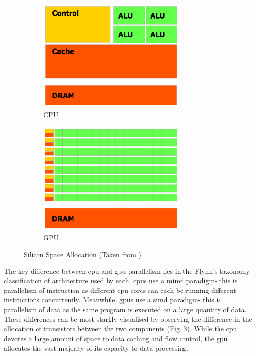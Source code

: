 \documentclass{UoYCSproject}
\begin{document}
\begin{figure}[htp]
\begin{subfigure}{0.50\textwidth}
\centering
\includegraphics[width=0.8\textwidth]{Appendix/CPU}
\caption{CPU}
\label{fig:cpu_structure}
\end{subfigure}
\begin{subfigure}{0.50\textwidth}
\centering
\includegraphics[width=0.8\textwidth]{Appendix/GPU}
\caption{GPU}
\label{fig:gpu_structure}
\end{subfigure}

\caption{Silicon Space Allocation (Taken from \cite[p.2]{cuda_doc})}
\label{fig:gpu_v_cpu}
\end{figure}

The key difference between \gls{cpu} and \gls{gpu} parallelism lies in the Flynn's taxonomy classification \cite{flynns_taxonomy} of architecture used by each.
\gls{cpu}s use a \gls{mimd} paradigm- this is parallelism of instruction as different \gls{cpu} cores can each be running different instructions concurrently.
Meanwhile, \gls{gpu}s use a \gls{simd} paradigm- this is parallelism of data as the same program is executed on a large quantity of data.
These differences can be most starkly visualised by observing the difference in the allocation of transistors between the two components (Fig. \ref{fig:gpu_v_cpu}). While the \gls{cpu} devotes a large amount of space to data caching and flow control, the \gls{gpu} allocates the vast majority of its capacity to data processing. \cite[p.2]{cuda_doc}
\end{document}
